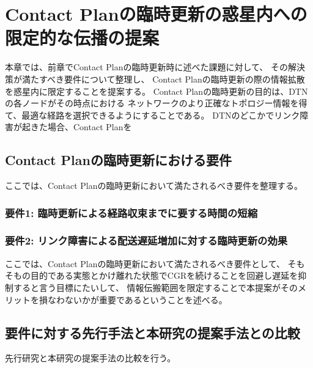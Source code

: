 \chapter{Contact Planの臨時更新の惑星内への限定的な伝播の提案}
\label{chap:suggestion}
本章では、前章でContact Planの臨時更新時に述べた課題に対して、
その解決策が満たすべき要件について整理し、
Contact Planの臨時更新の際の情報拡散を惑星内に限定することを提案する。
Contact Planの臨時更新の目的は、DTNの各ノードがその時点における
ネットワークのより正確なトポロジー情報を得て、最適な経路を選択できるようにすることである。
DTNのどこかでリンク障害が起きた場合、Contact Planを



\section{Contact Planの臨時更新における要件}
ここでは、Contact Planの臨時更新において満たされるべき要件を整理する。
\subsection{要件1: 臨時更新による経路収束までに要する時間の短縮}
\subsection{要件2: リンク障害による配送遅延増加に対する臨時更新の効果}
ここでは、Contact Planの臨時更新において満たされるべき要件として、
そもそもの目的である実態とかけ離れた状態でCGRを続けることを回避し遅延を抑制すると言う目標にたいして、
情報伝搬範囲を限定することで本提案がそのメリットを損なわないかが重要であるということを述べる。





\section{要件に対する先行手法と本研究の提案手法との比較}
先行研究と本研究の提案手法の比較を行う。
